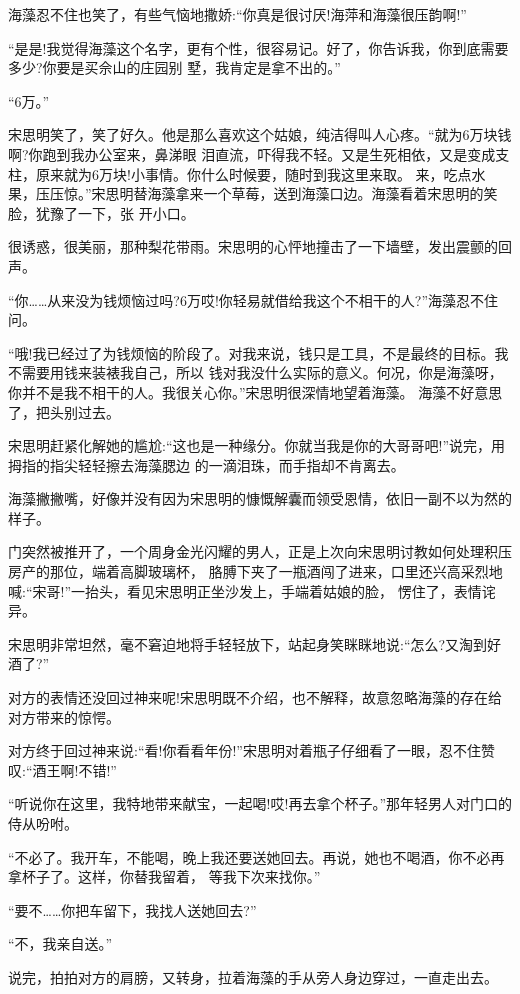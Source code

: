 \documentclass[11pt,a4paper,onecolumn]{article}
\begin{document}
海藻忍不住也笑了，有些气恼地撒娇:``你真是很讨厌!海萍和海藻很压韵啊!''

``是是!我觉得海藻这个名字，更有个性，很容易记。好了，你告诉我，你到底需要多少?你要是买佘山的庄园别
墅，我肯定是拿不出的。''

``6万。''

宋思明笑了，笑了好久。他是那么喜欢这个姑娘，纯洁得叫人心疼。``就为6万块钱啊?你跑到我办公室来，鼻涕眼
泪直流，吓得我不轻。又是生死相依，又是变成支柱，原来就为6万块!小事情。你什么时候要，随时到我这里来取。
来，吃点水果，压压惊。''宋思明替海藻拿来一个草莓，送到海藻口边。海藻看着宋思明的笑脸，犹豫了一下，张
开小口。

很诱惑，很美丽，那种梨花带雨。宋思明的心怦地撞击了一下墙壁，发出震颤的回声。

``你……从来没为钱烦恼过吗?6万哎!你轻易就借给我这个不相干的人?''海藻忍不住问。

``哦!我已经过了为钱烦恼的阶段了。对我来说，钱只是工具，不是最终的目标。我不需要用钱来装裱我自己，所以
钱对我没什么实际的意义。何况，你是海藻呀，你并不是我不相干的人。我很关心你。''宋思明很深情地望着海藻。
海藻不好意思了，把头别过去。

宋思明赶紧化解她的尴尬:``这也是一种缘分。你就当我是你的大哥哥吧!''说完，用拇指的指尖轻轻擦去海藻腮边
的一滴泪珠，而手指却不肯离去。

海藻撇撇嘴，好像并没有因为宋思明的慷慨解囊而领受恩情，依旧一副不以为然的样子。

门突然被推开了，一个周身金光闪耀的男人，正是上次向宋思明讨教如何处理积压房产的那位，端着高脚玻璃杯，
胳膊下夹了一瓶酒闯了进来，口里还兴高采烈地喊:``宋哥!''一抬头，看见宋思明正坐沙发上，手端着姑娘的脸，
愣住了，表情诧异。

宋思明非常坦然，毫不窘迫地将手轻轻放下，站起身笑眯眯地说:``怎么?又淘到好酒了?''

对方的表情还没回过神来呢!宋思明既不介绍，也不解释，故意忽略海藻的存在给对方带来的惊愕。

对方终于回过神来说:``看!你看看年份!''宋思明对着瓶子仔细看了一眼，忍不住赞叹:``酒王啊!不错!''

``听说你在这里，我特地带来献宝，一起喝!哎!再去拿个杯子。''那年轻男人对门口的侍从吩咐。

``不必了。我开车，不能喝，晚上我还要送她回去。再说，她也不喝酒，你不必再拿杯子了。这样，你替我留着，
等我下次来找你。''

``要不……你把车留下，我找人送她回去?''

``不，我亲自送。''

说完，拍拍对方的肩膀，又转身，拉着海藻的手从旁人身边穿过，一直走出去。
\end{document}

